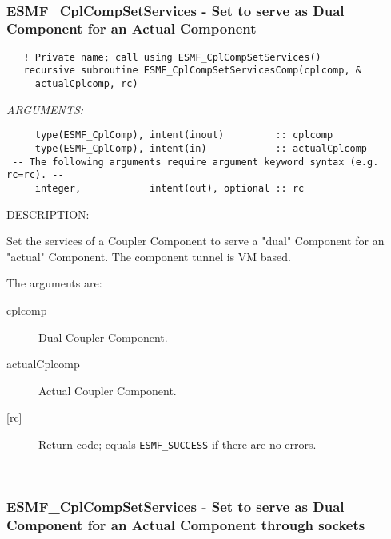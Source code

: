  
\mbox{}\hrulefill\ 
 
\subsubsection [ESMF\_CplCompSetServices] {ESMF\_CplCompSetServices - Set to serve as Dual Component for an Actual Component}


  
\begin{verbatim}   ! Private name; call using ESMF_CplCompSetServices()
   recursive subroutine ESMF_CplCompSetServicesComp(cplcomp, &
     actualCplcomp, rc)\end{verbatim}{\em ARGUMENTS:}
\begin{verbatim}     type(ESMF_CplComp), intent(inout)         :: cplcomp
     type(ESMF_CplComp), intent(in)            :: actualCplcomp
 -- The following arguments require argument keyword syntax (e.g. rc=rc). --
     integer,            intent(out), optional :: rc\end{verbatim}
{\sf DESCRIPTION:\\ }


   Set the services of a Coupler Component to serve a "dual" Component for an
   "actual" Component. The component tunnel is VM based.
  
   The arguments are:
   \begin{description}
   \item[cplcomp]
     Dual Coupler Component.
   \item[actualCplcomp]
     Actual Coupler Component.
   \item[{[rc]}]
     Return code; equals {\tt ESMF\_SUCCESS} if there are no errors.
   \end{description}
   
 
\mbox{}\hrulefill\ 
 
\subsubsection [ESMF\_CplCompSetServices] {ESMF\_CplCompSetServices - Set to serve as Dual Component for an Actual Component through sockets}


